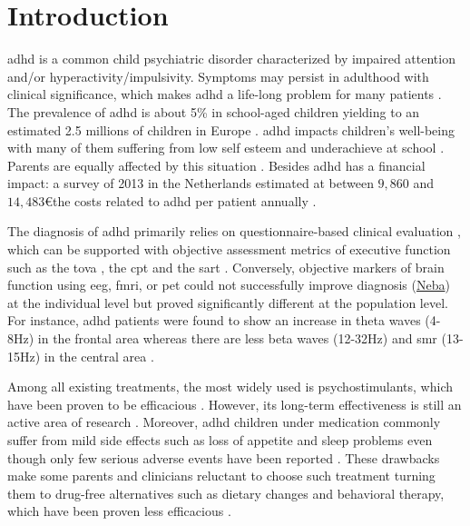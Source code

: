

\section{Introduction} 

\gls{adhd} is a common child psychiatric disorder characterized by impaired attention and/or hyperactivity/impulsivity.
Symptoms may persist in adulthood with clinical significance, which makes \gls{adhd} a life-long problem for many
patients \citep{Faraone2006}. The prevalence of \gls{adhd} is about 5\% in school-aged children yielding to an estimated
2.5 millions of children in Europe \citep{DSM-5}. \gls{adhd} impacts children's well-being with many of them suffering
from low self esteem \citep{Shaw2005} and underachieve at school \citep{Barry2002}. Parents are equally affected by this
situation \citep{Harpin2005}. Besides \gls{adhd} has a financial impact: a survey of 2013 in the Netherlands estimated
at between $9,860$ and $14,483$\euro the costs related to \gls{adhd} per patient annually \citep{le2014}. 
 
The diagnosis of \gls{adhd} primarily relies on questionnaire-based clinical evaluation \citep{DSM-5}, which can be
supported with objective assessment metrics of executive function such as the \gls{tova} \citep{Forbes1998}, the
\gls{cpt} \citep{Barkley1991} and the \gls{sart} \citep{Robertson1997}. Conversely, objective markers of brain function
using \gls{eeg}, \gls{fmri}, or \gls{pet} could not successfully improve diagnosis 
(\href{https://shop.nebahealth.com/products/neba-fda-cleared-brainwave-adhd-assessment-aid}{Neba}) at the individual
level but proved significantly different at the population level.  For instance, \gls{adhd} patients were found to show
an increase in theta waves (4-8Hz) in the frontal area whereas there are less beta waves (12-32Hz) and \gls{smr}
(13-15Hz) in the central area \citep{Monastra2005, Matouvsek1984, Janzen1995,loo2017}.  
 
Among all existing treatments, the most widely used is psychostimulants, which have been proven to be efficacious
\citep{Taylor2014, Storebo2015}. However, its long-term effectiveness is still an active area of research
\citep{DuPaul1998, Swanson2001, Jensen1999}. Moreover, \gls{adhd} children under medication commonly suffer from mild
side effects such as loss of appetite and sleep problems even though only few serious adverse events have been reported
\citep{Storebo2015, Cooper2011}. These drawbacks make some parents and clinicians reluctant to choose such treatment
turning them to drug-free alternatives such as dietary changes \citep{Belanger2009} and behavioral therapy, which have
been proven less efficacious \citep{Sonuga-Barke2013}.


